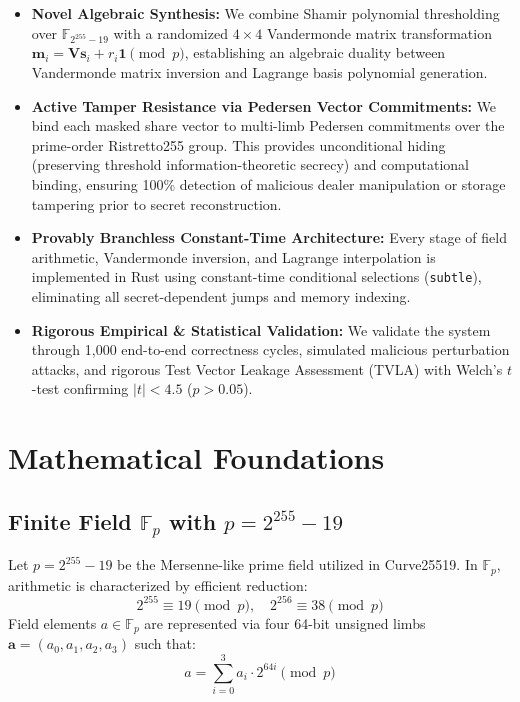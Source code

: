 \documentclass[10pt,journal,compsoc]{IEEEtran}
\begin{document}
\begin{itemize}
    \item \textbf{Novel Algebraic Synthesis:} We combine Shamir polynomial thresholding over $\mathbb{F}_{2^{255}-19}$ with a randomized $4 \times 4$ Vandermonde matrix transformation $\mathbf{m}_i = \mathbf{V}\mathbf{s}_i + r_i \mathbf{1} \pmod p$, establishing an algebraic duality between Vandermonde matrix inversion and Lagrange basis polynomial generation.
    \item \textbf{Active Tamper Resistance via Pedersen Vector Commitments:} We bind each masked share vector to multi-limb Pedersen commitments over the prime-order Ristretto255 group. This provides unconditional hiding (preserving threshold information-theoretic secrecy) and computational binding, ensuring 100\% detection of malicious dealer manipulation or storage tampering prior to secret reconstruction.
    \item \textbf{Provably Branchless Constant-Time Architecture:} Every stage of field arithmetic, Vandermonde inversion, and Lagrange interpolation is implemented in Rust using constant-time conditional selections (\texttt{subtle}), eliminating all secret-dependent jumps and memory indexing.
    \item \textbf{Rigorous Empirical \& Statistical Validation:} We validate the system through 1,000 end-to-end correctness cycles, simulated malicious perturbation attacks, and rigorous Test Vector Leakage Assessment (TVLA) with Welch's $t$-test confirming $|t| < 4.5$ ($p > 0.05$).
\end{itemize}

\section{Mathematical Foundations}

\subsection{Finite Field $\mathbb{F}_p$ with $p = 2^{255} - 19$}
Let $p = 2^{255} - 19$ be the Mersenne-like prime field utilized in Curve25519. In $\mathbb{F}_p$, arithmetic is characterized by efficient reduction:
\begin{equation}
2^{255} \equiv 19 \pmod p, \quad 2^{256} \equiv 38 \pmod p
\end{equation}
Field elements $a \in \mathbb{F}_p$ are represented via four 64-bit unsigned limbs $\mathbf{a} = (a_0, a_1, a_2, a_3)$ such that:
\begin{equation}
a = \sum_{i=0}^3 a_i \cdot 2^{64i} \pmod p
\end{equation}
\end{document}
